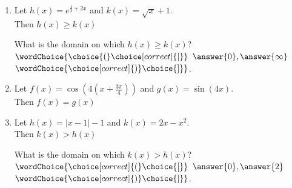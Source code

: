 \documentclass{ximera}
\begin{document}
\begin{exercise}
\begin{enumerate}
\item Let $h(x) = e^{\frac{1}{3} + 2x}$ and $k(x) =\sqrt{x}+1$. \\
Then $h(x) \geq k(x)$ 
\begin{multipleChoice}
\end{multipleChoice}
\begin{exercise}
What is the domain on which $h(x) \geq k(x)$?\\
$\wordChoice{\choice{(}\choice[correct]{[}}$ $\answer{0} , \answer{\infty}$ 
$\wordChoice{\choice[correct]{)}\choice{]}}$.
\end{exercise}

\item Let $f(x) = \cos\!\left(4\left(x+\frac{3\pi}{4}\right)\right)$ and $g(x) = \sin(4x)$. \\
Then $f(x)= g(x)$ 
\begin{multipleChoice}
\end{multipleChoice}

\item Let $h(x) = |x-1|-1$ and $k(x) = 2x-x^2$. \\
Then $k(x) > h(x)$ 
\begin{multipleChoice}
\end{multipleChoice}
\begin{exercise}
What is the domain on which $k(x) > h(x)$?\\
$\wordChoice{\choice[correct]{(}\choice{[}}$ $\answer{0} , \answer{2}$ 
$\wordChoice{\choice[correct]{)}\choice{]}}$.
\end{exercise}


\end{enumerate}

\end{exercise}
\end{document}
